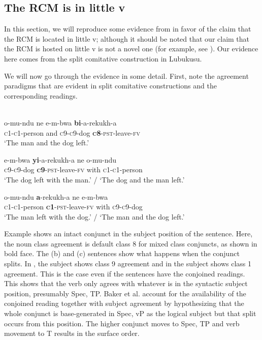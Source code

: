 \documentclass[output=paper]{langsci/langscibook}
\begin{document}
 
\subsection{The RCM is in little v}


In this section, we will reproduce some evidence from \citet{BakerEtAl2013} in favor of the claim that the RCM is located in little v; although it should be noted that our claim that the RCM is hosted on little v is not a novel one (for example, see \citealt{Bruening2006}). Our evidence here comes from the split comitative construction in Lubukusu. 

We will now go through the evidence in some detail. First, note the agreement paradigms that are evident in split comitative constructions and the corresponding readings. 



\ea\label{ex:}
\\
\ea
\gll   o-mu-ndu        ne   e-m-bwa  \textbf{{bi}}{-a-rekukh-a} \\
       \textsc{c1-c1}-person   and  \textsc{c9-c9}-dog   \textbf{\textsc{c}}\textbf{8}-\textsc{pst}-leave-\textsc{fv} \\
\glt   ‘The man and the dog left.’

\ex
\gll   e-m-bwa  \textbf{{yi}}-a-rekukh-a     ne   o-mu-ndu\\
       \textsc{c9-c9}-dog  \textbf{\textsc{c}}\textbf{9}-\textsc{pst}-leave-\textsc{fv}   with   \textsc{c1-c1}-person\\
\glt   ‘The dog left with the man.’ / ‘The dog and the man left.’

\ex
\gll   o-mu-ndu   \textbf{a}-rekukh-a     ne   e-m-bwa\\
       \textsc{c1-c1}-person   \textbf{\textsc{c}}\textbf{1}-\textsc{pst}-leave-\textsc{fv}   with   \textsc{c9-c9}-dog\\
\glt   ‘The man left with the dog.’ / ‘The man and the dog left.’
\z
\z

Example  shows an intact conjunct in the subject position of the sentence. Here, the noun class agreement is default class 8 for mixed class conjuncts, as shown in bold face. The (b) and (c) sentences show what happens when the conjunct splits. In , the subject shows class 9 agreement and in  the subject shows class 1 agreement. This is the case even if the sentences have the conjoined readings. This shows that the verb only agrees with whatever is in the syntactic subject position, presumably Spec, TP. Baker et al. account for the availability of the conjoined reading together with subject agreement by hypothesizing that the whole conjunct is base-generated in Spec, vP as the logical subject but that split occurs from this position. The higher conjunct moves to Spec, TP and verb movement to T results in the surface order.  
\end{document}
